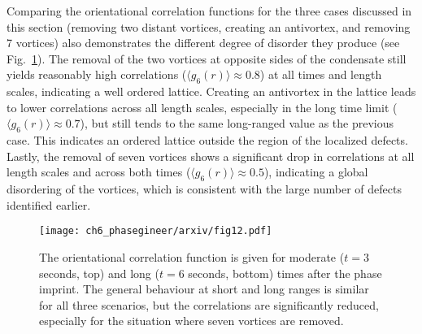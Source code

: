 Comparing the orientational correlation functions for the three cases discussed in this section (removing two distant vortices, creating an antivortex, and removing 7 vortices) also demonstrates the different degree of disorder they produce (see Fig.~\ref{fig:g6_2edge_anti_nuclear}). The removal of the two vortices at opposite sides of the condensate still yields reasonably high correlations ($\langle g_6(r) \rangle \approx 0.8$) at all times and length scales, indicating a well ordered lattice. Creating an antivortex in the lattice leads to lower correlations across all length scales, especially in the long time limit ($\langle g_6(r) \rangle\approx 0.7$), but still tends to the same long-ranged value as the previous case. This indicates an ordered lattice outside the region of the localized defects. Lastly, the removal of seven vortices shows a significant drop in correlations at all length scales and across both times ($\langle g_6(r) \rangle\approx 0.5$), indicating a global disordering of the vortices, which is consistent with the large number of defects identified earlier.

\begin{figure}[h!]\centering
    \texttt{[image: ch6\_phasegineer/arxiv/fig12.pdf]}
    \caption{The orientational correlation function is given for moderate ($t=3$ seconds, top) and long ($t=6$ seconds, bottom) times after the phase imprint. The general behaviour at short and long ranges is similar for all three scenarios, but the correlations are significantly reduced, especially for the situation where seven vortices are removed.}\label{fig:g6_2edge_anti_nuclear}
\end{figure}

